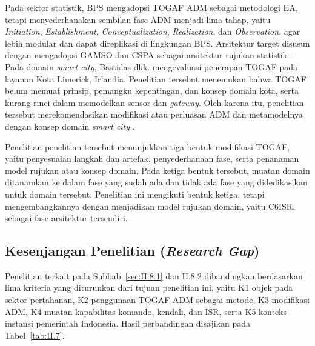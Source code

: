 Pada sektor statistik, BPS mengadopsi TOGAF ADM sebagai metodologi EA, tetapi menyederhanakan sembilan fase ADM menjadi lima tahap, yaitu \textit{Initiation}, \textit{Establishment}, \textit{Conceptualization}, \textit{Realization}, dan \textit{Observation}, agar lebih modular dan dapat direplikasi di lingkungan BPS. Arsitektur target disusun dengan mengadopsi GAMSO dan CSPA sebagai arsitektur rujukan statistik \cite{Virantina2020}. Pada domain \textit{smart city}, Bastidas dkk. mengevaluasi penerapan TOGAF pada layanan Kota Limerick, Irlandia. Penelitian tersebut menemukan bahwa TOGAF belum memuat prinsip, pemangku kepentingan, dan konsep domain kota, serta kurang rinci dalam memodelkan sensor dan \textit{gateway}. Oleh karena itu, penelitian tersebut merekomendasikan modifikasi atau perluasan ADM dan metamodelnya dengan konsep domain \textit{smart city} \cite{Bastidas2023}.

Penelitian-penelitian tersebut menunjukkan tiga bentuk modifikasi TOGAF, yaitu penyesuaian langkah dan artefak, penyederhanaan fase, serta penanaman model rujukan atau konsep domain. Pada ketiga bentuk tersebut, muatan domain ditanamkan ke dalam fase yang sudah ada dan tidak ada fase yang didedikasikan untuk domain tersebut. Penelitian ini mengikuti bentuk ketiga, tetapi mengembangkannya dengan menjadikan model rujukan domain, yaitu C6ISR, sebagai fase arsitektur tersendiri.

\subsection{Kesenjangan Penelitian (\textit{Research Gap})}
\label{sec:II.8.3}

Penelitian terkait pada Subbab~\ref{sec:II.8.1} dan II.8.2 dibandingkan berdasarkan lima kriteria yang diturunkan dari tujuan penelitian ini, yaitu K1 objek pada sektor pertahanan, K2 penggunaan TOGAF ADM sebagai metode, K3 modifikasi ADM, K4 muatan kapabilitas komando, kendali, dan ISR, serta K5 konteks instansi pemerintah Indonesia. Hasil perbandingan disajikan pada Tabel~\ref{tab:II.7}.

